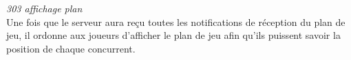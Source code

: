 \par

\textit{303 affichage plan} \\

Une fois que le serveur aura reçu toutes les notifications de réception du plan de jeu, il ordonne aux joueurs d'afficher le plan de jeu afin qu'ils puissent savoir la position de chaque concurrent. \\